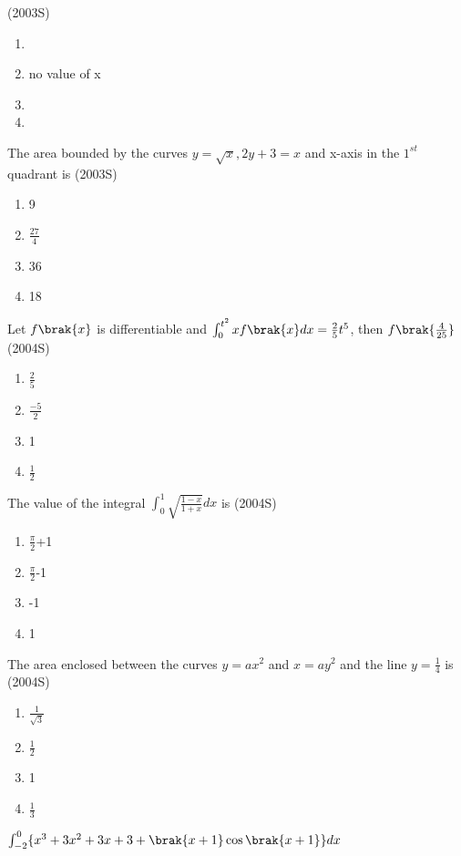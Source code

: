 	\hfill(2003S)
\begin{enumerate}
    \item {}
    \item no value of x
    \item {}
    \item {}
\end{enumerate}
  \item The area bounded by the curves $ y=\sqrt{x},2y+3=x$  and x-axis in the $1^{st}$ quadrant is
	  \hfill(2003S)
\begin{enumerate}
    \item 9
    \item $\frac{27}{4}$
    \item 36
    \item 18
\end{enumerate}
 \item Let $f\brak{x}$ is differentiable and $\int_{0}^{t^{2}}xf\brak{x}dx=\frac{2}{5}t^{5}$, then $f\brak{\frac{4}{25}}$
	 \hfill(2004S)
 \begin{enumerate}
	 \item $\frac{2}{5}$
	 \item $\frac{-5}{2}$
     \item 1
     \item $\frac{1}{2}$
 \end{enumerate}
 \item The value of the integral $\int_{0}^{1}\sqrt{\frac{1-x}{1+x}}dx$ is
	 \hfill(2004S)
\begin{enumerate}
 \item $\frac{\pi}{2}$+1
 \item $\frac{\pi}{2}$-1
 \item -1
 \item 1
 \end{enumerate}
 \item The area enclosed between the curves $y=ax^{2}$ and $x=ay^{2}$ and the line $y=\frac{1}{4}$ is
	 \hfill(2004S)
 \begin{enumerate}
	 \item $\frac{1}{\sqrt{3}}$
	 \item $\frac{1}{2}$
     \item 1
     \item $\frac{1}{3}$
 \end{enumerate}
 \item $\int_{-2}^{0}\{x^{3}+3x^{2}+3x+3+\brak{x+1}\cos\brak{x+1}\}dx$
 
